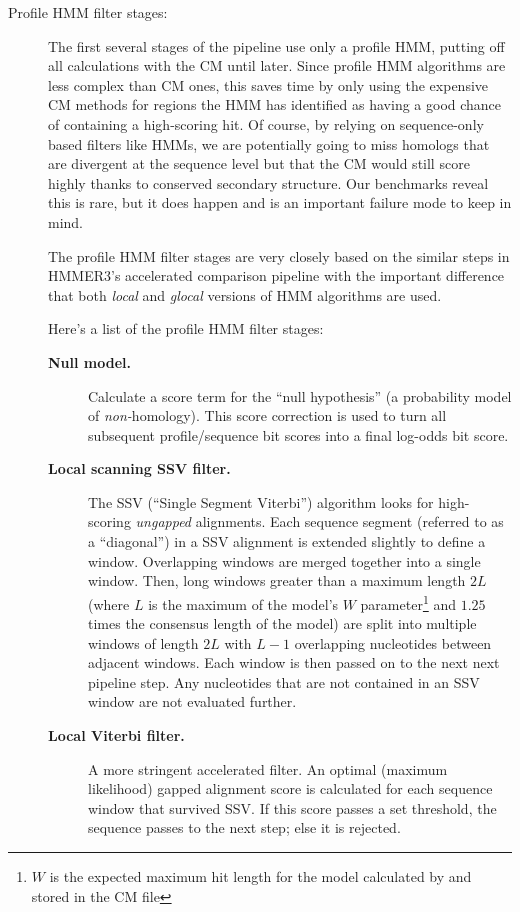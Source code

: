 \begin{description}
\item[Profile HMM filter stages:] The first several stages of the
  pipeline use only a profile HMM, putting off all calculations with
  the CM until later. Since profile HMM algorithms are less complex
  than CM ones, this saves time by only using the expensive CM
  methods for regions the HMM has identified as having a good chance
  of containing a high-scoring hit. Of course, by relying on
  sequence-only based filters like HMMs, we are potentially going to
  miss homologs that are divergent at the sequence level but that the
  CM would still score highly thanks to conserved secondary
  structure. Our benchmarks reveal this is rare, but it does happen
  and is an important failure mode to keep in mind.

  The profile HMM filter stages are very closely based on the similar
  steps in HMMER3's accelerated comparison pipeline with the important
  difference that both \emph{local} and \emph{glocal} versions of HMM
  algorithms are used.

  Here's a list of the profile HMM filter stages:
\begin{description}
\item[\textbf{Null model.}] Calculate a score term for the ``null
  hypothesis'' (a probability model of \emph{non-}homology). This
  score correction is used to turn all subsequent profile/sequence bit
  scores into a final log-odds bit score.
  
\item[\textbf{Local scanning SSV filter.}] The SSV (``Single Segment
  Viterbi'') algorithm looks for high-scoring \emph{ungapped}
  alignments. Each sequence segment (referred to as a ``diagonal'') in
  a SSV alignment is extended slightly to define a window. Overlapping
  windows are merged together into a single window. Then, long windows
  greater than a maximum length $2L$ (where $L$ is the maximum of the
  model's $W$ parameter\footnote{$W$ is the expected maximum hit
  length for the model calculated by  and stored in the
  CM file} and $1.25$ times the consensus length of the model) are
  split into multiple windows of length $2L$ with $L-1$ overlapping
  nucleotides between adjacent windows. Each window is then passed on
  to the next next pipeline step. Any nucleotides that are not
  contained in an SSV window are not evaluated further.

\item[\textbf{Local Viterbi filter.}] A more stringent accelerated
  filter. An optimal (maximum likelihood) gapped alignment score is
  calculated for each sequence window that survived SSV. If this score
  passes a set threshold, the sequence passes to the next step; else
  it is rejected.


\end{description}
\end{description}
